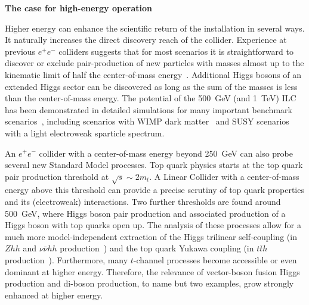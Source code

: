 
{\bf The case for high-energy operation}

Higher energy can enhance the scientific return of the installation in several
ways. It naturally increases the direct discovery reach of the collider. Experience at
previous $e^+e^-$ colliders suggests that for most scenarios it is straightforward to
discover or exclude pair-production of new particles with masses almost up to the
kinematic limit of half the center-of-mass energy~\cite{Fujii:2017ekh}. Additional
Higgs bosons of an extended Higgs sector can be discovered as long as the sum of
the masses is less than the center-of-mass energy. The potential
of the 500~GeV (and 1~TeV) ILC has been demonstrated in detailed simulations
for many important benchmark scenarios~\cite{Fujii:2015jha,Baer:2013cma}, including
scenarios with WIMP dark matter~\cite{Bartels:2012ex} and SUSY scenarios with
a light electroweak sparticle spectrum\cite{Berggren:2013vfa}.

An $e^+e^-$ collider with a center-of-mass energy beyond 250~GeV can also
probe several new Standard Model processes.
Top quark physics starts at the top quark pair production threshold at
$\sqrt{s}\sim 2 m_t$. A Linear Collider with a center-of-mass energy
above this threshold can provide a precise scrutiny of top quark
properties and its (electroweak) interactions.
Two further thresholds are found around 500~GeV, where Higgs boson pair production
and associated production of a Higgs boson with top quarks open up.
The analysis of these processes allow for a much more model-independent
extraction of the Higgs trilinear self-coupling (in $Zhh$ and $\nu \bar{\nu}hh$
production~\cite{Barklow:2017awn}) and the top quark Yukawa
coupling (in $t\bar{t}h$ production~\cite{Yonamine:2011jg}). 
Furthermore, many $t$-channel processes become accessible or even dominant
at higher energy. Therefore, the relevance of vector-boson
fusion Higgs production and di-boson production, to name but two examples,
grow strongly enhanced at higher energy.

